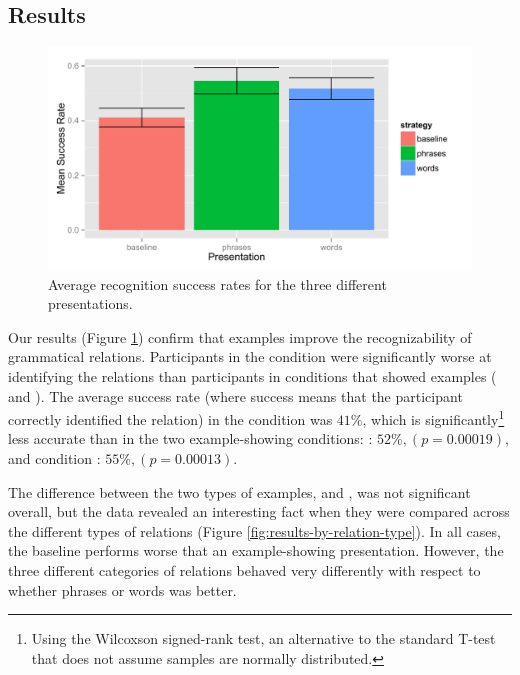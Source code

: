 \subsection{Results}
\begin{figure}
\includegraphics[width=1.0\columnwidth]{fig/overall-success-rates}
\caption{
	\label{fig:overall-success-rates} Average recognition success rates for the three different presentations.
}
\end{figure}
Our results (Figure \ref{fig:overall-success-rates}) confirm that examples improve the recognizability of grammatical relations. Participants in the  condition were significantly worse at identifying the relations than participants in conditions that showed examples ( and ).  The average success rate (where success means that the participant correctly identified the relation) in the  condition was $41\%$, which is significantly\footnote{Using the Wilcoxson signed-rank test, an alternative to the standard T-test that does not assume samples are normally distributed.} less accurate than in the two example-showing conditions: : $52\%, (p = 0.00019)$, and  condition : $55\%, (p = 0.00013)$.

The difference between the two types of examples,   and ,  was not significant overall, but the data revealed an interesting fact when they were compared across the different types  of relations (Figure \ref{fig:results-by-relation-type}). In all cases, the baseline performs worse that an example-showing presentation. However, the three different categories of relations behaved very differently with respect to whether phrases or words was better.

